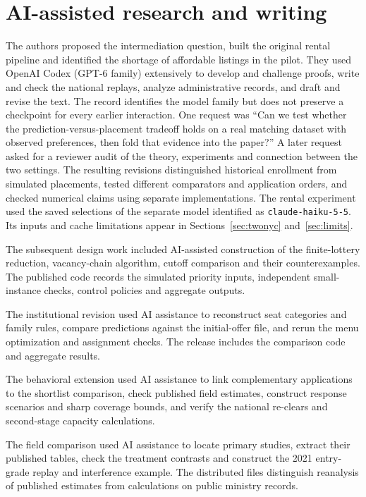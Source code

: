 \clearpage
\section{AI-assisted research and writing}\label{sec:ai-use}
The authors proposed the intermediation question, built the original rental pipeline and identified the shortage of affordable listings in the pilot. They used OpenAI Codex (GPT-6 family) extensively to develop and challenge proofs, write and check the national replays, analyze administrative records, and draft and revise the text. The record identifies the model family but does not preserve a checkpoint for every earlier interaction. One request was “Can we test whether the prediction-versus-placement tradeoff holds on a real matching dataset with observed preferences, then fold that evidence into the paper?” A later request asked for a reviewer audit of the theory, experiments and connection between the two settings. The resulting revisions distinguished historical enrollment from simulated placements, tested different comparators and application orders, and checked numerical claims using separate implementations. The rental experiment used the saved selections of the separate model identified as \texttt{claude-haiku-5-5}. Its inputs and cache limitations appear in Sections~\ref{sec:twonyc} and~\ref{sec:limits}.

The subsequent design work included AI-assisted construction of the finite-lottery reduction, vacancy-chain algorithm, cutoff comparison and their counterexamples. The published code records the simulated priority inputs, independent small-instance checks, control policies and aggregate outputs.

The institutional revision used AI assistance to reconstruct seat categories and family rules, compare predictions against the initial-offer file, and rerun the menu optimization and assignment checks. The release includes the comparison code and aggregate results.

The behavioral extension used AI assistance to link complementary applications to the shortlist comparison, check published field estimates, construct response scenarios and sharp coverage bounds, and verify the national re-clears and second-stage capacity calculations.

The field comparison used AI assistance to locate primary studies, extract their published tables, check the treatment contrasts and construct the 2021 entry-grade replay and interference example. The distributed files distinguish reanalysis of published estimates from calculations on public ministry records.

